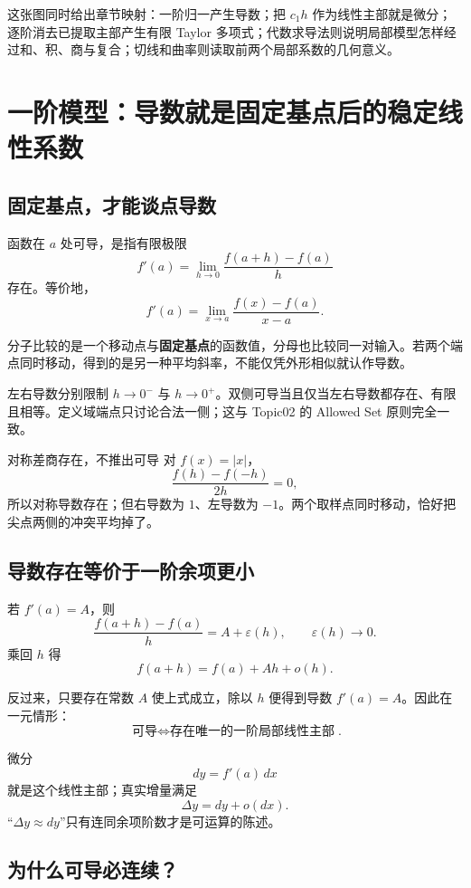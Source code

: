 \documentclass[11pt,a4paper]{ctexart}
\begin{document}
这张图同时给出章节映射：一阶归一产生导数；把 $c_1h$ 作为线性主部就是微分；逐阶消去已提取主部产生有限 Taylor 多项式；代数求导法则说明局部模型怎样经过和、积、商与复合；切线和曲率则读取前两个局部系数的几何意义。

\section{一阶模型：导数就是固定基点后的稳定线性系数}

\subsection{固定基点，才能谈点导数}

函数在 $a$ 处可导，是指有限极限
\[
f'(a)=\lim_{h\to0}\frac{f(a+h)-f(a)}{h}
\]
存在。等价地，
\[
f'(a)=\lim_{x\to a}\frac{f(x)-f(a)}{x-a}.
\]

分子比较的是一个移动点与\textbf{固定基点}的函数值，分母也比较同一对输入。若两个端点同时移动，得到的是另一种平均斜率，不能仅凭外形相似就认作导数。

左右导数分别限制 $h\to0^-$ 与 $h\to0^+$。双侧可导当且仅当左右导数都存在、有限且相等。定义域端点只讨论合法一侧；这与 Topic02 的 Allowed Set 原则完全一致。

\begin{warnbox}{对称差商存在，不推出可导}
对 $f(x)=|x|$，
\[
\frac{f(h)-f(-h)}{2h}=0,
\]
所以对称导数存在；但右导数为 $1$、左导数为 $-1$。两个取样点同时移动，恰好把尖点两侧的冲突平均掉了。
\end{warnbox}

\subsection{导数存在等价于一阶余项更小}

若 $f'(a)=A$，则
\[
\frac{f(a+h)-f(a)}{h}=A+\varepsilon(h),
\qquad \varepsilon(h)\to0.
\]
乘回 $h$ 得
\[
\boxed{f(a+h)=f(a)+Ah+o(h)}.
\]

反过来，只要存在常数 $A$ 使上式成立，除以 $h$ 便得到导数 $f'(a)=A$。因此在一元情形：
\[
\boxed{\text{可导}\iff\text{存在唯一的一阶局部线性主部}}.
\]

微分
\[
dy=f'(a)\,dx
\]
就是这个线性主部；真实增量满足
\[
\Delta y=dy+o(dx).
\]
“$\Delta y\approx dy$”只有连同余项阶数才是可运算的陈述。

\subsection{为什么可导必连续？}
\end{document}
